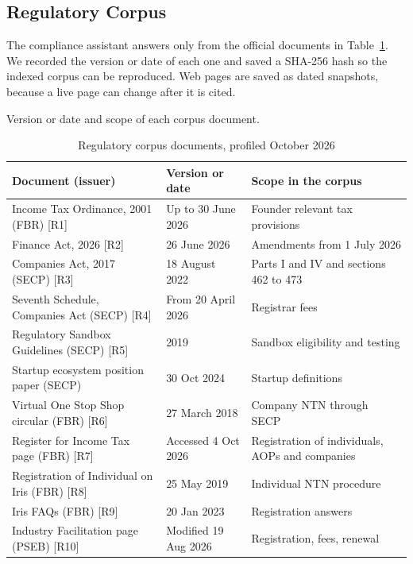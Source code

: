 \documentclass{FastFyp}
\makeatletter
\newcommand{\src}[1]{[#1]}
\newcommand{\capdesc}[1]{%
  \par\nobreak
  \begingroup
  \setstretch{1}%
  \ifdefstring{\@captype}{figure}%
    {\vspace{0.2\baselineskip}}%
    {\vspace{-0.8\baselineskip}}%
  {\centering\normalfont\itshape\small
   \begin{minipage}{0.92\textwidth}\centering #1\end{minipage}\par}%
  \endgroup
  \vspace{0.4\baselineskip}%
}
\makeatother
\begin{document}
\subsection{Regulatory Corpus}
The compliance assistant answers only from the official documents in Table~\ref{tab:corpus}. We recorded the version or date of each one and saved a SHA-256 hash so the indexed corpus can be reproduced. Web pages are saved as dated snapshots, because a live page can change after it is cited.

\begin{table}[!ht]
\centering
\caption{Regulatory corpus documents, profiled October 2026}
\capdesc{Version or date and scope of each corpus document.}
\begin{tabular}{|p{6cm}|p{3.5cm}|p{4.3cm}|}
\hline
\textbf{Document (issuer)} & \textbf{Version or date} & \textbf{Scope in the corpus} \\
\hline
Income Tax Ordinance, 2001 (FBR) \src{R1} & Up to 30 June 2026 & Founder relevant tax provisions \\
\hline
Finance Act, 2026 \src{R2} & 26 June 2026 & Amendments from 1 July 2026 \\
\hline
Companies Act, 2017 (SECP) \src{R3} & 18 August 2022 & Parts I and IV and sections 462 to 473 \\
\hline
Seventh Schedule, Companies Act (SECP) \src{R4} & From 20 April 2026 & Registrar fees \\
\hline
Regulatory Sandbox Guidelines (SECP) \src{R5} & 2019 & Sandbox eligibility and testing \\
\hline
Startup ecosystem position paper (SECP) \cite{ref:secpposition} & 30 Oct 2024 & Startup definitions \\
\hline
Virtual One Stop Shop circular (FBR) \src{R6} & 27 March 2018 & Company NTN through SECP \\
\hline
Register for Income Tax page (FBR) \src{R7} & Accessed 4 Oct 2026 & Registration of individuals, AOPs and companies \\
\hline
Registration of Individual on Iris (FBR) \src{R8} & 25 May 2019 & Individual NTN procedure \\
\hline
Iris FAQs (FBR) \src{R9} & 20 Jan 2023 & Registration answers \\
\hline
Industry Facilitation page (PSEB) \src{R10} & Modified 19 Aug 2026 & Registration, fees, renewal \\
\hline
\end{tabular}
\label{tab:corpus}
\end{table}
\end{document}
